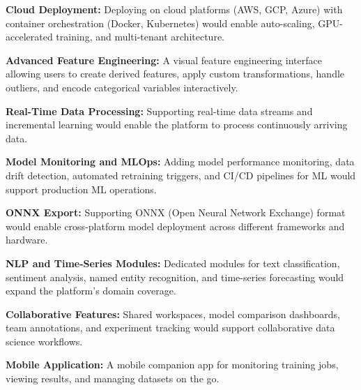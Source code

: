 \documentclass[12pt,a4paper]{report}
\begin{document}
\vspace{0.3cm}

\textbf{Cloud Deployment:}
Deploying on cloud platforms (AWS, GCP, Azure) with container orchestration (Docker, Kubernetes) would enable auto-scaling, GPU-accelerated training, and multi-tenant architecture.

\vspace{0.3cm}

\textbf{Advanced Feature Engineering:}
A visual feature engineering interface allowing users to create derived features, apply custom transformations, handle outliers, and encode categorical variables interactively.

\vspace{0.3cm}

\textbf{Real-Time Data Processing:}
Supporting real-time data streams and incremental learning would enable the platform to process continuously arriving data.

\vspace{0.3cm}

\textbf{Model Monitoring and MLOps:}
Adding model performance monitoring, data drift detection, automated retraining triggers, and CI/CD pipelines for ML would support production ML operations.

\vspace{0.3cm}

\textbf{ONNX Export:}
Supporting ONNX (Open Neural Network Exchange) format would enable cross-platform model deployment across different frameworks and hardware.

\vspace{0.3cm}

\textbf{NLP and Time-Series Modules:}
Dedicated modules for text classification, sentiment analysis, named entity recognition, and time-series forecasting would expand the platform's domain coverage.

\vspace{0.3cm}

\textbf{Collaborative Features:}
Shared workspaces, model comparison dashboards, team annotations, and experiment tracking would support collaborative data science workflows.

\vspace{0.3cm}

\textbf{Mobile Application:}
A mobile companion app for monitoring training jobs, viewing results, and managing datasets on the go.

\vspace{0.5cm}
\end{document}
